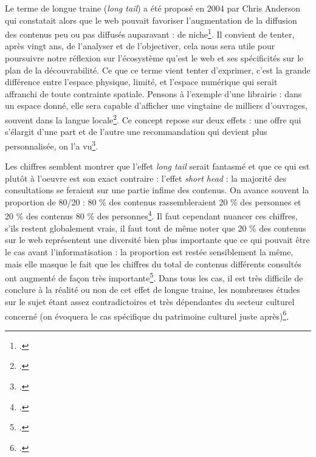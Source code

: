 Le terme de longue traine (\textit{long tail}) a été proposé en 2004 par Chris Anderson qui constatait alors que le web pouvait favoriser l’augmentation de la diffusion des contenus peu ou pas diffusés auparavant : de niche\footcite[§ 8]{benghozi_longue_2008}. Il convient de tenter, après vingt ans, de l’analyser et de l’objectiver, cela nous sera utile pour poursuivre notre réflexion sur l’écosystème qu’est le web et ses spécificités sur le plan de la découvrabilité. Ce que ce terme vient tenter d’exprimer, c’est la grande différence entre l’espace physique, limité, et l’espace numérique qui serait affranchi de toute contrainte spatiale. Pensons à l’exemple d’une librairie : dans un espace donné, elle sera capable d’afficher une vingtaine de milliers d’ouvrages, souvent dans la langue locale\footcite[§ 11 et § 12]{benghozi_longue_2008}. Ce concept repose sur deux effets : une offre qui s’élargit d’une part et de l’autre une recommandation qui devient plus personnalisée, on l’a vu\footcite[§ 17]{bourreau2015a}.

Les chiffres semblent montrer que l’effet \textit{long tail} serait fantasmé et que ce qui est plutôt à l'oeuvre est son exact contraire : l’effet \textit{short head} : la majorité des consultations se feraient sur une partie infime des contenus. On avance souvent la proportion de 80/20 : 80 \% des contenus rassembleraient 20 \% des personnes et 20 \% des contenus 80 \% des personnes\footcite[§ 10]{bourreau2015a}. Il faut cependant nuancer ces chiffres, s’ils restent globalement vrais, il faut tout de même noter que 20 \% des contenus sur le web représentent une diversité bien plus importante que ce qui pouvait être le cas avant l’informatisation : la proportion est restée sensiblement la même, mais elle masque le fait que les chiffres du total de contenus différents consultés ont augmenté de façon très importante\footcite[§ 15]{bourreau2015a}. Dans tous les cas, il est très difficile de conclure à la réalité ou non de cet effet de longue traine, les nombreuses études sur le sujet étant assez contradictoires et très dépendantes du secteur culturel concerné (on évoquera le cas spécifique du patrimoine culturel juste après)\footcite[tableau 1]{bourreau2015a}.

